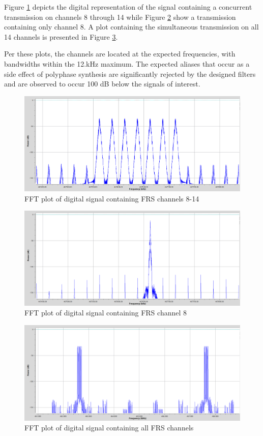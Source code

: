 Figure \ref{fig:osmo-ch8-14} depicts the digital representation of the signal
containing a concurrent transmission on channels 8 through 14 while Figure
\ref{fig:osmo-ch8} show a transmission containing only channel 8. A plot
containing the simultaneous transmission on all 14 channels is presented in
Figure \ref{fig:osmo-all}.

Per these plots, the channels are located at the expected frequencies, with
bandwidths within the 12.kHz maximum. The expected aliases that occur as a side
effect of polyphase synthesis \cite{TRONDEAU_PFB} are significantly rejected by
the designed filters and are observed to occur 100 dB below the signals of
interest.

\begin{figure}[h!]
  \centering
  \includegraphics[width=4.75in]{images/frs/results/osmo-ch8-14.png}
  \caption{FFT plot of digital signal containing FRS channels 8-14}
  \label{fig:osmo-ch8-14}
\end{figure}

\begin{figure}[h!]
  \centering
  \includegraphics[width=4.75in]{images/frs/results/osmo-ch8.png}
  \caption{FFT plot of digital signal containing FRS channel 8}
  \label{fig:osmo-ch8}
\end{figure}

\begin{figure}[h!]
  \centering
  \includegraphics[width=4.75in]{images/frs/results/osmo_all_ch.png}
  \caption{FFT plot of digital signal containing all FRS channels}
  \label{fig:osmo-all}
\end{figure}

